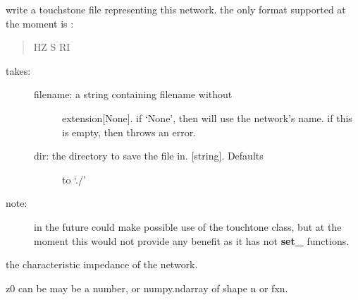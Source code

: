 \documentclass[letterpaper,10pt,english]{sphinxmanual}
\begin{document}
\begin{fulllineitems}
\begin{fulllineitems}
\end{fulllineitems}


\begin{fulllineitems}
\label{auto_network:mwavepy.Network.write_touchstone}
write a touchstone file representing this network.  the only 
format supported at the moment is :
\begin{quote}

HZ S RI
\end{quote}
\begin{description}
\item[{takes: }] \leavevmode\begin{description}
\item[{filename: a string containing filename without }] \leavevmode
extension{[}None{]}. if `None', then will use the network's 
name. if this is empty, then throws an error.

\item[{dir: the directory to save the file in. {[}string{]}. Defaults }] \leavevmode
to `./'

\end{description}

\item[{note:}] \leavevmode
in the future could make possible use of the touchtone 
class, but at the moment this would not provide any benefit 
as it has not {\color{red}\bfseries{}set\_} functions.

\end{description}

\end{fulllineitems}


\begin{fulllineitems}
\label{auto_network:mwavepy.Network.y}
\end{fulllineitems}


\begin{fulllineitems}
\label{auto_network:mwavepy.Network.z0}
the characteristic impedance of the network.

z0 can be may be a number, or numpy.ndarray of shape n or fxn.

\end{fulllineitems}


\end{fulllineitems}
\end{document}
